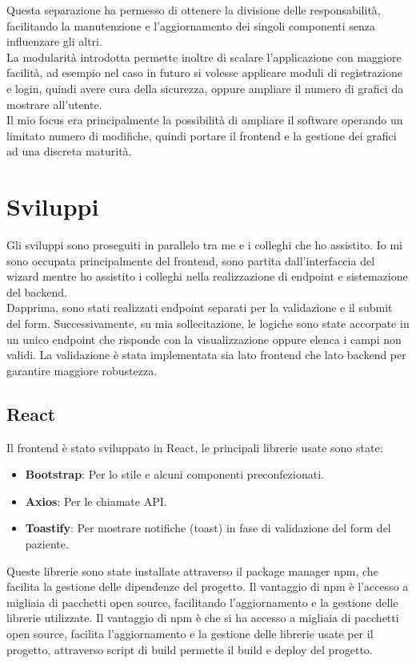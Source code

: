 Questa separazione ha permesso di ottenere la divisione delle responsabilità, facilitando la manutenzione e l'aggiornamento dei singoli componenti senza influenzare gli altri.\\
La modularità introdotta permette inoltre di scalare l'applicazione con maggiore facilità, ad esempio nel caso in futuro si volesse applicare moduli di registrazione e login, quindi avere cura della sicurezza, oppure ampliare il numero di grafici da mostrare all'utente. \\
Il mio focus era principalmente la possibilità di ampliare il software operando un limitato numero di modifiche, quindi portare il frontend e la gestione dei grafici ad una discreta maturità.

\section{Sviluppi}
Gli sviluppi sono proseguiti in parallelo tra me e i colleghi che ho assistito. Io mi sono occupata principalmente del frontend, sono partita dall'interfaccia del wizard mentre ho assistito i colleghi nella realizzazione di endpoint e sistemazione del backend.\\
Dapprima, sono stati realizzati endpoint separati per la validazione e il submit del form. Successivamente, su mia sollecitazione, le logiche sono state accorpate in un unico endpoint che risponde con la visualizzazione oppure elenca i campi non validi. La validazione è stata implementata sia lato frontend che lato backend per garantire maggiore robustezza.\\

\subsection{React}
Il frontend è stato sviluppato in React, le principali librerie usate sono state:
\begin{itemize}
    \item \textbf{Bootstrap}: Per lo stile e alcuni componenti preconfezionati.
    \item \textbf{Axios}: Per le chiamate API.
    \item \textbf{Toastify}: Per mostrare notifiche (toast) in fase di validazione del form del paziente.
\end{itemize}

Queste librerie sono state installate attraverso il package manager npm, che facilita la gestione delle dipendenze del progetto. Il vantaggio di npm è l'accesso a migliaia di pacchetti open source, facilitando l'aggiornamento e la gestione delle librerie utilizzate. Il vantaggio di npm è che si ha accesso a migliaia di pacchetti open source, facilita l'aggiornamento e la gestione delle librerie usate per il progetto, attraverso script di build permette il build e deploy del progetto. 

